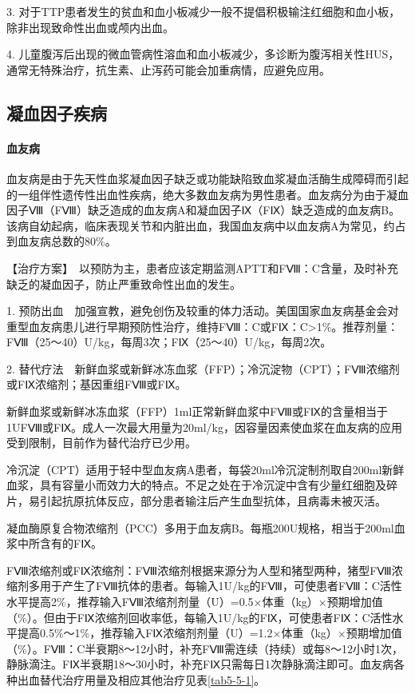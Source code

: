 3.
对于TTP患者发生的贫血和血小板减少一般不提倡积极输注红细胞和血小板，除非出现致命性出血或颅内出血。

4.
儿童腹泻后出现的微血管病性溶血和血小板减少，多诊断为腹泻相关性HUS，通常无特殊治疗，抗生素、止泻药可能会加重病情，应避免应用。

\subsection{凝血因子疾病}

\paragraph{血友病}

血友病是由于先天性血浆凝血因子缺乏或功能缺陷致血浆凝血活酶生成障碍而引起的一组伴性遗传性出血性疾病，绝大多数血友病为男性患者。血友病分为由于凝血因子Ⅷ（FⅧ）缺乏造成的血友病A和凝血因子Ⅸ（FⅨ）缺乏造成的血友病B。该病自幼起病，临床表现关节和内脏出血，我国血友病中以血友病A为常见，约占到血友病总数的80\%。

【治疗方案】　以预防为主，患者应该定期监测APTT和FⅧ：C含量，及时补充缺乏的凝血因子，防止严重致命性出血的发生。

1.
预防出血　加强宣教，避免创伤及较重的体力活动。美国国家血友病基金会对重型血友病患儿进行早期预防性治疗，维持FⅧ：C或FⅨ：C\textgreater{}1\%。推荐剂量：FⅧ（25～40）U/kg，每周3次；FⅨ（25～40）U/kg，每周2次。

2.
替代疗法　新鲜血浆或新鲜冰冻血浆（FFP）；冷沉淀物（CPT）；FⅧ浓缩剂或FⅨ浓缩剂；基因重组FⅧ或FⅨ。

新鲜血浆或新鲜冰冻血浆（FFP）1ml正常新鲜血浆中FⅧ或FⅨ的含量相当于1UFⅧ或FⅨ。成人一次最大用量为20ml/kg，因容量因素使血浆在血友病的应用受到限制，目前作为替代治疗已少用。

冷沉淀（CPT）适用于轻中型血友病A患者，每袋20ml冷沉淀制剂取自200ml新鲜血浆，具有容量小而效力大的特点。不足之处在于冷沉淀中含有少量红细胞及碎片，易引起抗原抗体反应，部分患者输注后产生血型抗体，且病毒未被灭活。

凝血酶原复合物浓缩剂（PCC）多用于血友病B。每瓶200U规格，相当于200ml血浆中所含有的FⅨ。

FⅧ浓缩剂或FⅨ浓缩剂：FⅧ浓缩剂根据来源分为人型和猪型两种，猪型FⅧ浓缩剂多用于产生了FⅧ抗体的患者。每输入1U/kg的FⅧ，可使患者FⅧ：C活性水平提高2\%，推荐输入FⅧ浓缩剂剂量（U）=0.5×体重（kg）×预期增加值（\%）。但由于FⅨ浓缩剂回收率低，每输入1U/kg的FⅨ，可使患者FⅨ：C活性水平提高0.5\%～1\%，推荐输入FⅨ浓缩剂剂量（U）=1.2×体重（kg）×预期增加值（\%）。FⅧ：C半衰期8～12小时，补充FⅧ需连续（持续）或每8～12小时1次，静脉滴注。FⅨ半衰期18～30小时，补充FⅨ只需每日1次静脉滴注即可。血友病各种出血替代治疗用量及相应其他治疗见表\ref{tab5-5-1}。

